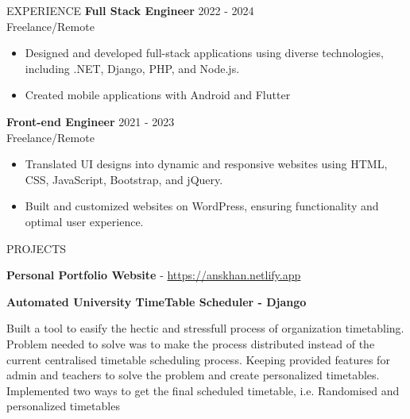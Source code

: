 \documentclass{resume} %
\begin{document}
\begin{rSection}{EXPERIENCE}
	\textbf{Full Stack Engineer} \hfill 2022 - 2024\\
	Freelance/Remote %
	\begin{itemize}
		\itemsep -3pt {} 
		\item Designed and developed full-stack applications using diverse technologies, including .NET, Django, PHP, and Node.js.
		\item Created mobile applications with Android and Flutter
	\end{itemize}
	
	
	\textbf{Front-end Engineer} \hfill 2021  - 2023\\
	Freelance/Remote  \hfill %
	\begin{itemize}
		\itemsep -3pt {} 
		\item Translated UI designs into dynamic and responsive websites using HTML, CSS, JavaScript, Bootstrap, and jQuery.
		
		\item Built and customized websites on WordPress, ensuring functionality and optimal user experience. \\
		
	\end{itemize}
	
	
	

  
\begin{rSection}{PROJECTS}
\vspace{-1.25em}
\item \textbf{Personal Portfolio Website}  - \href{https://anskhan.netlify.app}{https://anskhan.netlify.app}


\item \textbf{Automated University TimeTable Scheduler - Django}





 {Built a tool to easify the hectic and stressfull process of organization timetabling. Problem needed to solve was to make the process distributed instead of the current centralised timetable scheduling process. Keeping provided features for admin and teachers to solve the problem and create personalized timetables. Implemented two ways to get the final scheduled timetable, i.e. Randomised and personalized timetables}


\end{rSection}
\end{rSection}
\end{document}
